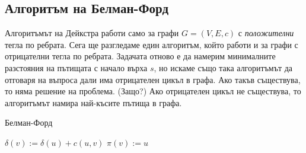 \newpage
\subsection{Алгоритъм на Белман-Форд}

Алгоритъмът на Дейкстра работи само за графи $G = (V,E,c)$ с {\em положителни} тегла по ребрата.
Сега ще разгледаме един алгоритъм, който работи и за графи с отрицателни тегла по ребрата.
Задачата отново е да намерим минималните разстояния на пътищата с начало върха $s$, но
искаме също така алгоритъмът да отговаря на въпроса дали има отрицателен цикъл в графа. 
Ако такъв съществува, то няма решение на проблема. (Защо?)
Ако отрицателен цикъл не съществува, то алгоритъмът намира най-късите пътища в графа.


\begin{algorithm}
  \caption{Белман-Форд}
  \label{alg:belman-ford}
  
  \begin{algorithmic}[1]
    \STATE {}
    \STATE $\delta(v) := \delta(u) + c(u,v)$
    \STATE $\pi(v) := u$
    \ENDIF
    \ENDFOR
    \ENDFOR
    
    \RETURN \FALSE
    \ENDIF
    \ENDFOR
    \RETURN \TRUE
    
  \end{algorithmic}
\end{algorithm}


